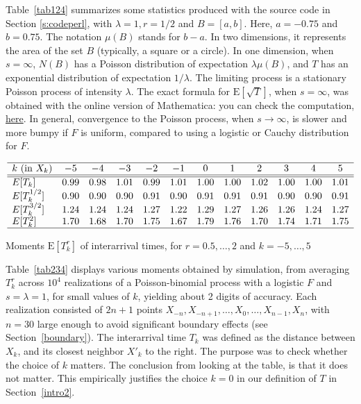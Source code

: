 \documentclass[10pt]{article}
\begin{document}
\noindent Table~\ref{tab124} summarizes some statistics produced with the source code in Section \ref{s:codeperl}, with $\lambda=1, r=1/2$ and $B=[a, b]$. Here, $a=-0.75$ and $b=0.75$. The notation $\mu(B)$ stands for $b-a$. In two dimensions, it represents the area of the set $B$ (typically, a square or a circle). In one dimension, when $s=\infty$, $N(B)$ has a Poisson distribution of expectation $\lambda\mu(B)$, and $T$ has an exponential distribution of expectation $1/\lambda$. The limiting process is a stationary Poisson process of intensity $\lambda$. The exact formula for $\mbox{E}[\sqrt{T}]$, when $s=\infty$, was obtained with the online version of Mathematica: you can check the computation, \href{https://bit.ly/30t354T}{here}. In general, convergence to the Poisson process, when $s\rightarrow\infty$, is slower and more bumpy if $F$ is uniform, compared to using a logistic or Cauchy distribution for $F$.

\begin{table}[H]
\[
\begin{array}{lccccccccccc}
\hline
k \mbox{ } (\mbox{in } X_k) & -5 &-4&-3 & -2&-1&0&1&2&3&4&5\\
\hline
\hline
E[T_k] & 0.99 &0.98&1.01 & 0.99&1.01&1.00&1.00&1.02&1.00&1.00&1.01\\
E[T_k^{1/2}] & 0.90 &0.90&0.90 & 0.91&0.90&0.91&0.91&0.91&0.90&0.90&0.91\\
E[T_k^{3/2}] & 1.24 &1.24&1.24 & 1.27&1.22&1.29&1.27&1.26&1.26&1.24&1.27\\
E[T_k^2] & 1.70 &1.68&1.70 & 1.75&1.67&1.79&1.76&1.70&1.74&1.71&1.75\\
\hline
\end{array}
\]
\caption{\label{tab234}Moments $\mbox{E}[T_k^r]$ of interarrival times, for $r=0.5,\dots,2$ and $k=-5,\dots,5$}
\end{table}

\noindent Table~\ref{tab234} displays various moments obtained by simulation, from averaging $T_k^r$ across $10^4$ realizations of a Poisson-binomial process with a logistic $F$ and $s=\lambda=1$, for small values of $k$, yielding about 2 digits of accuracy.
Each realization consisted of $2n+1$ points $X_{-n},X_{-n+1},\dots,X_0,\dots,X_{n-1},X_{n}$, with $n=30$ large enough to 
avoid significant \textcolor{index}{boundary effects} (see Section~\ref{boundary}). The interarrival time $T_k$ was defined as the distance between $X_k$, and its closest neighbor $X'_k$ to the right.
The purpose was to check whether the choice of $k$ matters. The conclusion from looking at the table, is that it does not matter.
This empirically justifies the choice $k=0$  in our definition of $T$ in Section~\ref{intro2}. 
\end{document}

